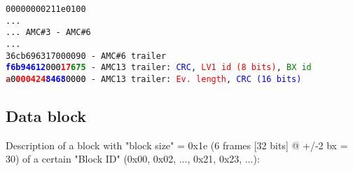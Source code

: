 \texttt{00000000211e0100}\\
\texttt{...}\\
\texttt{... AMC\#3 - AMC\#6}\\
\texttt{...}\\
\texttt{36cb696317000090 - AMC\#6 trailer}\\
\texttt{\textcolor{blue}{\textbf{f6b94612}}\textcolor{black}{000}\textcolor{red}{\textbf{17}}\textcolor{green}{\textbf{675}} - AMC13 trailer: \textcolor{blue}{CRC}, \textcolor{red}{LV1 id (8 bits)}, \textcolor{green}{BX id}}\\
\texttt{\textcolor{brown}{\textbf{a}}\textcolor{black}{0}\textcolor{red}{\textbf{000424}}\textcolor{blue}{\textbf{8468}}\textcolor{black}{0000} - AMC13 trailer: \textcolor{red}{Ev. length}, \textcolor{blue}{CRC (16 bits)}}\\

\clearpage

\subsection{Data block}
Description of a block with "block size" = 0x1e (6 frames [32 bits] @ +/-2 bx = 30) of a certain "Block ID" (0x00, 0x02, ..., 0x21, 0x23, ...):


